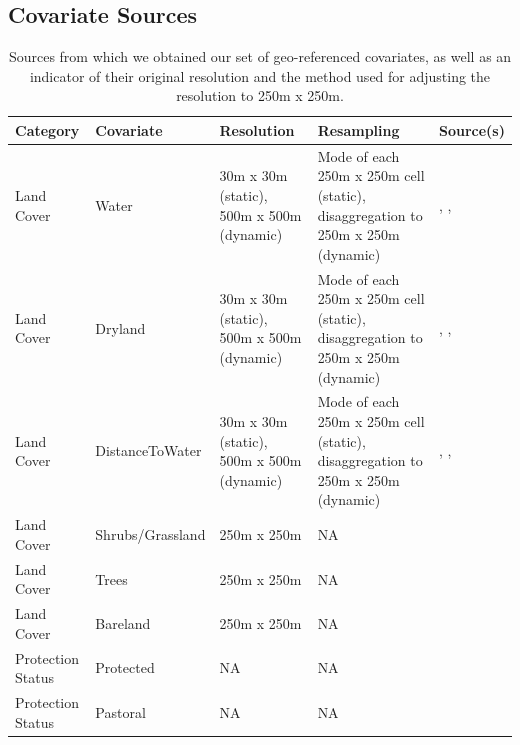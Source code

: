 \documentclass[abstract=on,10pt,a4paper,bibliography=totocnumbered]{scrartcl}
\begin{document}
\newpage
\subsection{Covariate Sources}
\label{Appendix:Sources}
\begin{table}[h]
  \begin{center}
    \caption{Sources from which we obtained our set of geo-referenced
    covariates, as well as an indicator of their original resolution and the
    method used for adjusting the resolution to 250m x 250m.}
    \label{Sources}
    \resizebox{\textwidth}{!} {
      \begin{tabular}{llp{4cm}p{4cm}p{7cm}}
      \hline
      \textbf{Category} &
        \textbf{Covariate} &
          \textbf{Resolution} &
            \textbf{Resampling} &
              \textbf{Source(s)} \\
      \midrule
      Land Cover
        & Water
          & 30m x 30m (static), 500m x 500m (dynamic)
            & Mode of each 250m x 250m cell (static), disaggregation to 250m x 250m (dynamic)
              & \cite{Chen.2015}, \cite{Schaaf.2015}, \cite{Yamazaki.2019} \\
      Land Cover
        & Dryland
          & 30m x 30m (static), 500m x 500m (dynamic)
            & Mode of each 250m x 250m cell (static), disaggregation to 250m x 250m (dynamic)
              & \cite{Chen.2015}, \cite{Schaaf.2015}, \cite{Yamazaki.2019} \\
      Land Cover
        & DistanceToWater
          & 30m x 30m (static), 500m x 500m (dynamic)
            & Mode of each 250m x 250m cell (static), disaggregation to 250m x 250m (dynamic)
              & \cite{Chen.2015}, \cite{Schaaf.2015}, \cite{Yamazaki.2019} \\
      Land Cover
        & Shrubs/Grassland
          & 250m x 250m
            & NA
              & \cite{Dimiceli.2015} \\
      Land Cover
        & Trees
          & 250m x 250m
            & NA
              & \cite{Dimiceli.2015} \\
      Land Cover
        & Bareland
          & 250m x 250m
            & NA
              & \cite{Dimiceli.2015} \\
      \hdashline
      Protection Status
        & Protected
          & NA
            & NA
              & \cite{PeaceParks.2019} \\
      Protection Status
        & Pastoral
          & NA
            & NA
              & \cite{PeaceParks.2019} \\

\end{tabular}}
\end{center}
\end{table}
\end{document}
